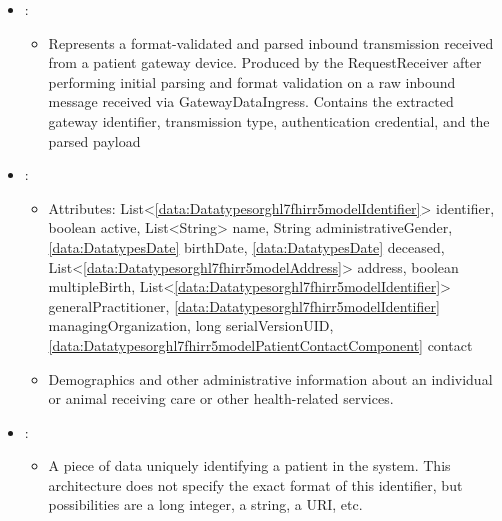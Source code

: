 \begin{itemize}[nolistsep,noitemsep]
\begin{itemize}[noitemsep,nolistsep]
\item[] Enum: \textsc{registered}, \textsc{preliminary}, \textsc{final}, \textsc{amended}, \textsc{corrected}, \textsc{cancelled}, \textsc{enteredinerror}, \textsc{unknown}, \textsc{null}.\\The status of the observation result value or the RiskAssessment.
\end{itemize}

\item {}: 
\begin{itemize}[noitemsep,nolistsep]

\item[] Represents a format-validated and parsed inbound transmission received from a patient gateway device. Produced by the RequestReceiver after performing initial parsing and format validation on a raw inbound message received via GatewayDataIngress. Contains the extracted gateway identifier, transmission type, authentication credential, and the parsed payload
\end{itemize}

\item {}: 
\begin{itemize}[noitemsep,nolistsep]
\item[] Attributes: List\textless{}\ref{data:Datatypesorghl7fhirr5modelIdentifier}\textgreater{} identifier, boolean active, List\textless{}String\textgreater{} name, String administrativeGender, \ref{data:DatatypesDate} birthDate, \ref{data:DatatypesDate} deceased, List\textless{}\ref{data:Datatypesorghl7fhirr5modelAddress}\textgreater{} address, boolean multipleBirth, List\textless{}\ref{data:Datatypesorghl7fhirr5modelIdentifier}\textgreater{} generalPractitioner, \ref{data:Datatypesorghl7fhirr5modelIdentifier} managingOrganization, long serialVersionUID, \ref{data:Datatypesorghl7fhirr5modelPatientContactComponent} contact
\item[] Demographics and other administrative information about an individual or animal receiving care or other health-related services.
\end{itemize}

\item {}: 
\begin{itemize}[noitemsep,nolistsep]

\item[] A piece of data uniquely identifying a patient in the system. This architecture does not
specify the exact format of this identifier, but possibilities are a long integer, a string, a URI, etc.
\end{itemize}


\end{itemize}
